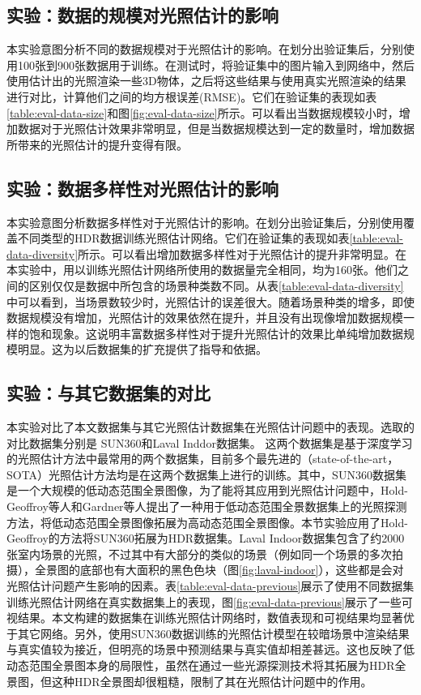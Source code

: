 \subsection{实验：数据的规模对光照估计的影响}

本实验意图分析不同的数据规模对于光照估计的影响。在划分出验证集后，分别使用100张到900张数据用于训练。在测试时，将验证集中的图片输入到网络中，然后使用估计出的光照渲染一些3D物体，之后将这些结果与使用真实光照渲染的结果进行对比，计算他们之间的均方根误差(RMSE)。它们在验证集的表现如表\ref{table:eval-data-size}和图\ref{fig:eval-data-size}所示。可以看出当数据规模较小时，增加数据对于光照估计效果非常明显，但是当数据规模达到一定的数量时，增加数据所带来的光照估计的提升变得有限。

\subsection{实验：数据多样性对光照估计的影响}

本实验意图分析数据多样性对于光照估计的影响。在划分出验证集后，分别使用覆盖不同类型的HDR数据训练光照估计网络。它们在验证集的表现如表\ref{table:eval-data-diversity}所示。可以看出增加数据多样性对于光照估计的提升非常明显。在本实验中，用以训练光照估计网络所使用的数据量完全相同，均为160张。他们之间的区别仅仅是数据中所包含的场景种类数不同。从表\ref{table:eval-data-diversity}中可以看到，当场景数较少时，光照估计的误差很大。随着场景种类的增多，即使数据规模没有增加，光照估计的效果依然在提升，并且没有出现像增加数据规模一样的饱和现象。这说明丰富数据多样性对于提升光照估计的效果比单纯增加数据规模明显。这为以后数据集的扩充提供了指导和依据。
\subsection{实验：与其它数据集的对比}

本实验对比了本文数据集与其它光照估计数据集在光照估计问题中的表现。选取的对比数据集分别是
SUN360\cite{xiao2012recognizing}和Laval Inddor\cite{gardner2017learning}数据集。
这两个数据集是基于深度学习的光照估计方法中最常用的两个数据集，目前多个最先进的（state-of-the-art，SOTA）光照估计方法均是在这两个数据集上进行的训练。其中，SUN360数据集是一个大规模的低动态范围全景图像，为了能将其应用到光照估计问题中，Hold-Geoffroy等人\cite{hold2017deep}和Gardner等人\cite{gardner2017learning}提出了一种用于低动态范围全景数据集上的光照探测方法，将低动态范围全景图像拓展为高动态范围全景图像。本节实验应用了Hold-Geoffroy的方法将SUN360拓展为HDR数据集。Laval Indoor数据集包含了约2000张室内场景的光照，不过其中有大部分的类似的场景（例如同一个场景的多次拍摄），全景图的底部也有大面积的黑色色块（图\ref{fig:laval-indoor}），这些都是会对光照估计问题产生影响的因素。表\ref{table:eval-data-previous}展示了使用不同数据集训练光照估计网络在真实数据集上的表现，图\ref{fig:eval-data-previous}展示了一些可视结果。本文构建的数据集在训练光照估计网络时，数值表现和可视结果均显著优于其它网络。另外，使用SUN360数据训练的光照估计模型在较暗场景中渲染结果与真实值较为接近，但明亮的场景中预测结果与真实值却相差甚远。这也反映了低动态范围全景图本身的局限性，虽然在通过一些光源探测技术将其拓展为HDR全景图，但这种HDR全景图却很粗糙，限制了其在光照估计问题中的作用。


